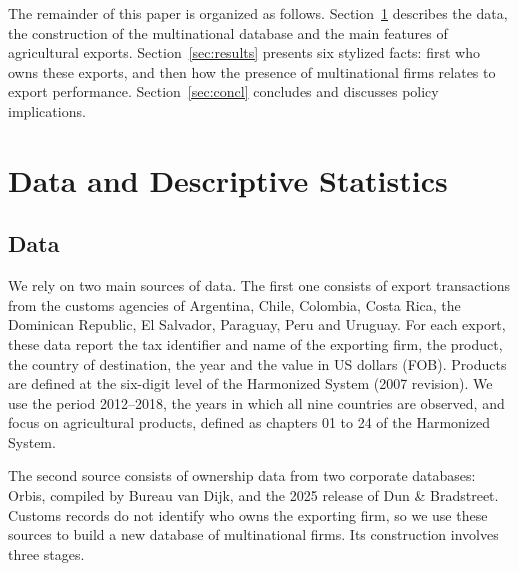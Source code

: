 \documentclass[11pt,a4paper]{article}
\begin{document}
The remainder of this paper is organized as follows. Section~\ref{sec:data} describes the data, the
construction of the multinational database and the main features of agricultural exports.
Section~\ref{sec:results} presents six stylized facts: first who owns these exports, and then how
the presence of multinational firms relates to export performance. Section~\ref{sec:concl} concludes
and discusses policy implications.

\section{Data and Descriptive Statistics}\label{sec:data}
\subsection{Data}\label{sec:data_data}

We rely on two main sources of data. The first one consists of export transactions from the
customs agencies of Argentina, Chile, Colombia, Costa Rica, the Dominican Republic, El Salvador,
Paraguay, Peru and Uruguay. For each export, these data report the tax identifier and name of the
exporting firm, the product, the country of destination, the year and the value in US dollars
(FOB). Products are defined at the six-digit level of the Harmonized System (2007 revision). We use
the period 2012--2018, the years in which all nine countries are observed, and focus on
agricultural products, defined as chapters 01 to 24 of the Harmonized System.

The second source consists of ownership data from two corporate databases: Orbis, compiled by
Bureau van Dijk, and the 2025 release of Dun \& Bradstreet. Customs records do not identify who
owns the exporting firm, so we use these sources to build a new database of multinational firms.
Its construction involves three stages.
\end{document}

